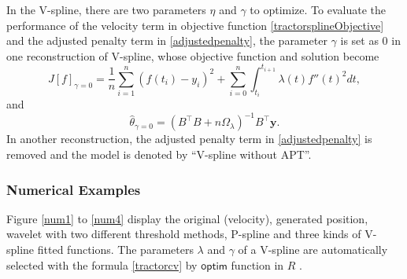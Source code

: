 In the V-spline, there are two parameters $\eta$ and $\gamma$ to optimize. To evaluate the performance of the velocity term in objective function \eqref{tractorsplineObjective} and the adjusted penalty term in \eqref{adjustedpenalty}, the parameter $\gamma$ is set as 0 in one reconstruction of V-spline, whose objective function and solution become
\begin{equation}\label{ofgamma0}
J[f]_{\gamma=0}= \frac{1}{n} \sum_{i=1}^{n} \left(f(t_i)-y_i\right)^2 +\sum_{i=0}^{n} \int_{t_i}^{t_{i+1}}\lambda(t) f''(t)^2 dt,
\end{equation}
and
\begin{equation}\label{thetahat0}
\hat{\theta}_{\gamma=0}=\left( B^\top B+n\Omega_{\lambda}\right)^{-1} B^\top\mathbf{y}.
\end{equation}
In another reconstruction, the adjusted penalty term in \eqref{adjustedpenalty} is removed and the model is denoted by ``V-spline without APT''. 




\subsubsection{Numerical Examples}


Figure \ref{num1} to \ref{num4} display the original (velocity), generated position, wavelet with two different threshold methods, P-spline and three kinds of V-spline fitted functions. The parameters $\lambda$ and $\gamma$ of a V-spline are automatically selected with the formula \eqref{tractorcv} by $\textsf{optim}$ function in $R$ \citep{nelder1965simplex}.


